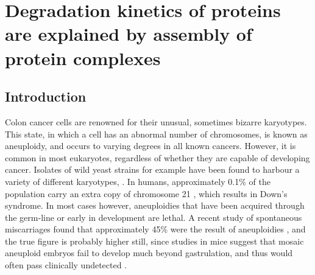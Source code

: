 \documentclass[a4paper,11pt,twoside,openright]{scrbook}
\begin{document}
\chapter{Degradation kinetics of proteins are explained by assembly of protein complexes}

\section{Introduction}

Colon cancer cells are renowned for their unusual, sometimes bizarre karyotypes. This state, in which a cell has an abnormal number of chromosomes, is known as aneuploidy, and occurs to varying degrees in all known cancers. However, it is common in most eukaryotes, regardless of whether they are capable of developing cancer. Isolates of wild yeast strains for example have been found to harbour a variety of different karyotypes, \cite{Hose2015}. In humans, approximately 0.1\% of the population carry an extra copy of chromosome 21 \cite{Presson2013}, which results in Down's syndrome. In most cases however, aneuploidies that have been acquired through the germ-line or early in development are lethal. A recent study of spontaneous miscarriages found that approximately 45\% were the result of aneuploidies \cite{Jia2015}, and the true figure is probably higher still, since studies in mice suggest that mosaic aneuploid embryos fail to develop much beyond gastrulation, and thus would often pass clinically undetected \cite{Lightfoot2006}.
\end{document}
